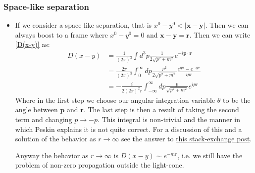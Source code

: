 \documentclass[11pt]{article}
\numberwithin{equation}{section}
\begin{document}
\subsubsection{Space-like separation}
\begin{itemize}
  \item If we consider a space like separation, that is $ x^{0}-y^{0} <|\textbf{x} - \textbf{y}|$. Then we can always boost to a frame where $x^{0}-y^{0}= 0$ and $\textbf{x} - \textbf{y} = \textbf{r}$. Then we can write \ref{D(x-y)} as: 
  \begin{align*}
  D(x-y) & = \frac{1}{(2\pi)^3}\int d^3p \frac{1}{2\sqrt{p^2+m^2}}e^{-i \textbf{p}\cdot \textbf{r}} \\
    & = \frac{2 \pi}{(2\pi)^3}\int_{0}^{\infty} dp \frac{p^2}{2\sqrt{p^2+m^2}}\frac{e^{ipr}-e^{-ipr }}{ipr} \\
    & = -\frac{i}{2(2\pi)^2r}\int_{-\infty}^{\infty} dp \frac{p}{\sqrt{p^2+m^2}}e^{ipr}
  \end{align*}
  Where in the first step we choose our angular integration variable $\theta$ to be the angle between $\textbf{p}$ and $\textbf{r}$. The last step is then a result of taking the second term and changing $p \rightarrow -p$. This integral is non-trivial and the manner in which Peskin explains it is not quite correct. For a discussion of this and a solution of the behavior as $r \rightarrow \infty$ see the answer to \href{https://physics.stackexchange.com/questions/758661/what-is-the-missing-part-of-the-argument-needed-to-justify-the-claim-of-2-52-i}{this stack-exchange post}. 


  Anyway the behavior as $r \rightarrow \infty$ is $D(x-y) \sim e^{-mr}$, i.e. we still have the problem of non-zero propagation outside the light-cone. 
\end{itemize}
\end{document}
